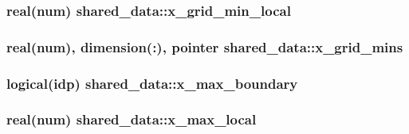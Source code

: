 \subsubsection[{\texorpdfstring{x\+\_\+grid\+\_\+min\+\_\+local}{x_grid_min_local}}]{\setlength{\rightskip}{0pt plus 5cm}real(num) shared\+\_\+data\+::x\+\_\+grid\+\_\+min\+\_\+local}\hypertarget{namespaceshared__data_a12ab3a40a19df149a5d322939704a393}{}\label{namespaceshared__data_a12ab3a40a19df149a5d322939704a393}
\subsubsection[{\texorpdfstring{x\+\_\+grid\+\_\+mins}{x_grid_mins}}]{\setlength{\rightskip}{0pt plus 5cm}real(num), dimension(\+:), pointer shared\+\_\+data\+::x\+\_\+grid\+\_\+mins}\hypertarget{namespaceshared__data_ab595b2b077b3dd6067602742e089c333}{}\label{namespaceshared__data_ab595b2b077b3dd6067602742e089c333}
\subsubsection[{\texorpdfstring{x\+\_\+max\+\_\+boundary}{x_max_boundary}}]{\setlength{\rightskip}{0pt plus 5cm}logical(idp) shared\+\_\+data\+::x\+\_\+max\+\_\+boundary}\hypertarget{namespaceshared__data_aaa822590de7afd77e48ecc4d9016fe29}{}\label{namespaceshared__data_aaa822590de7afd77e48ecc4d9016fe29}
\subsubsection[{\texorpdfstring{x\+\_\+max\+\_\+local}{x_max_local}}]{\setlength{\rightskip}{0pt plus 5cm}real(num) shared\+\_\+data\+::x\+\_\+max\+\_\+local}\hypertarget{namespaceshared__data_ab8f75a4e4e6aa88619c4f1cfde4dae1c}{}\label{namespaceshared__data_ab8f75a4e4e6aa88619c4f1cfde4dae1c}
